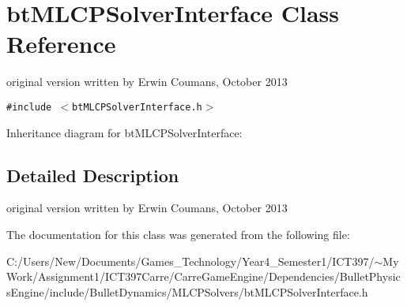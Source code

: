 \hypertarget{classbt_m_l_c_p_solver_interface}{
\section{btMLCPSolverInterface Class Reference}
\label{classbt_m_l_c_p_solver_interface}
}
original version written by Erwin Coumans, October 2013  


{\tt \#include $<$btMLCPSolverInterface.h$>$}

Inheritance diagram for btMLCPSolverInterface:

\subsection{Detailed Description}
original version written by Erwin Coumans, October 2013 

The documentation for this class was generated from the following file:\begin{CompactItemize}
\item 
C:/Users/New/Documents/Games\_\-Technology/Year4\_\-Semester1/ICT397/$\sim$My Work/Assignment1/ICT397Carre/CarreGameEngine/Dependencies/BulletPhysicsEngine/include/BulletDynamics/MLCPSolvers/btMLCPSolverInterface.h\end{CompactItemize}
